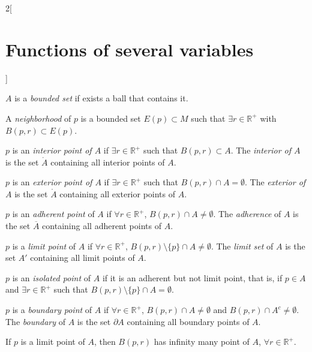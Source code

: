 \documentclass[class=article,10pt,crop=false]{standalone}
\begin{document}
\begin{multicols}{2}[\section{Functions of several variables}]
\begin{definition}
$A$ is a \textit{bounded set} if exists a ball that contains it.
\end{definition}
\begin{definition}
A \textit{neighborhood} of $p$ is a bounded set $E(p)\subset M$ such that $\exists r\in\mathbb{R}^+$ with $B(p,r)\subset E(p)$.
\end{definition}
\begin{definition}
$p$ is an \textit{interior point of $A$} if $\exists r\in\mathbb{R}^+$ such that $B(p,r)\subset A$. The \textit{interior of $A$} is the set $\mathring A$ containing all interior points of $A$.
\end{definition}
\begin{definition}
$p$ is an \textit{exterior point of $A$} if $\exists r\in\mathbb{R}^+$ such that $B(p,r)\cap A=\emptyset$. The \textit{exterior of $A$} is the set $\mathring A$ containing all exterior points of $A$.
\end{definition}
\begin{definition}
$p$ is an \textit{adherent point} of $A$ if $\forall r\in\mathbb{R}^+$, $B(p,r)\cap A\ne\emptyset$. The \textit{adherence} of $A$ is the set $\overline{A}$ containing all adherent points of $A$.
\end{definition}
\begin{definition}
$p$ is a \textit{limit point} of $A$ if $\forall r\in\mathbb{R}^+$, $B(p,r)\setminus\{p\}\cap A\ne\emptyset$. The \textit{limit set} of $A$ is the set $A'$ containing all limit points of $A$.
\end{definition}
\begin{definition}
$p$ is an \textit{isolated point} of $A$ if it is an adherent but not limit point, that is, if $p\in A$ and $\exists r\in\mathbb{R}^+$ such that $B(p,r)\setminus\{p\}\cap A=\emptyset$.
\end{definition}
\begin{definition}
$p$ is a \textit{boundary point} of $A$ if $\forall r\in\mathbb{R}^+$, $B(p,r)\cap A\ne\emptyset$ and $B(p,r)\cap A^c\ne\emptyset$. The \textit{boundary} of $A$ is the set $\partial A$ containing all boundary points of $A$.
\end{definition}
\begin{prop}
If $p$ is a limit point of $A$, then $B(p,r)$ has infinity many point of $A$, $\forall r\in\mathbb{R}^+$.
\end{prop}
\begin{theorem}

\end{theorem}
\end{multicols}
\end{document}
